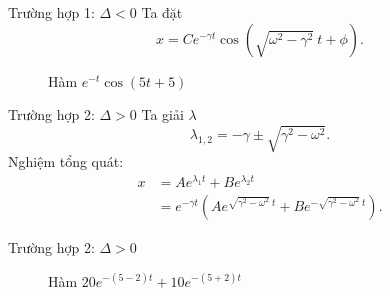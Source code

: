 \begin{frame}{Trường hợp 1: \(\Delta <0\)}
    Ta đặt
    \begin{equation}
        x = C e^{-\gamma t}  \cos{\left(\sqrt{\omega^2 - \gamma^2} \ t + \phi \right)}.
        \label{eq:2.2_10}
    \end{equation}
    \begin{figure}[!htb]
        \centering
        \caption{Hàm \(e^{-t} \cos{\left(5t + 5 \right)}\)}
    \end{figure}
\end{frame}
\begin{frame}{Trường hợp 2: \(\Delta > 0\)}
    Ta giải \(\lambda\)
    \begin{equation*}
        \lambda_{1,2} =  - \gamma \pm  \sqrt{\gamma^2 - \omega^2}.
    \end{equation*}    
    Nghiệm tổng quát:
    \begin{equation}
    \begin{array}{cl}
    x &= A e^{\lambda_1 t} + B e^{\lambda_2 t} \\
    &= e^{-\gamma t} \left(A e^{\sqrt{\gamma^2 - \omega^2} \ t} + B e^{- \sqrt{\gamma^2 - \omega^2} \ t} \right).
    \end{array}
    \label{eq:2.2_11}
    \end{equation}
\end{frame}
\begin{frame}{Trường hợp 2: \(\Delta > 0\)}
\begin{figure}[!htb]
    \centering
    \caption{Hàm \(20 e^{-(5-2)t} + 10 e^{-(5+2)t}\)}
\end{figure}
\end{frame}
